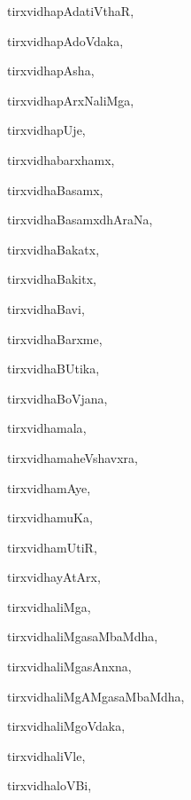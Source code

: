 \begin{multicols}{3}
{\noindent
{tirxvidhapAdatiVthaR}, \pageref{tirxvidhapAdatiVthaR}

\noindent
{tirxvidhapAdoVdaka}, \pageref{tirxvidhapAdoVdaka}

\noindent
{tirxvidhapAsha}, \pageref{tirxvidhapAsha}

\noindent
{tirxvidhapArxNaliMga}, \pageref{tirxvidhapArxNaliMga}

\noindent
{tirxvidhapUje}, \pageref{tirxvidhapUje}

\noindent
{tirxvidhabarxhamx}, \pageref{tirxvidhabarxhamx}

\noindent
{tirxvidhaBasamx}, \pageref{tirxvidhaBasamx}

\noindent
{tirxvidhaBasamxdhAraNa}, \pageref{tirxvidhaBasamxdhAraNa}

\noindent
{tirxvidhaBakatx}, \pageref{tirxvidhaBakatx}

\noindent
{tirxvidhaBakitx}, \pageref{tirxvidhaBakitx}

\noindent
{tirxvidhaBavi}, \pageref{tirxvidhaBavi}

\noindent
{tirxvidhaBarxme}, \pageref{tirxvidhaBarxme}

\noindent
{tirxvidhaBUtika}, \pageref{tirxvidhaBUtika}

\noindent
{tirxvidhaBoVjana}, \pageref{tirxvidhaBoVjana}

\noindent
{tirxvidhamala}, \pageref{tirxvidhamala}

\noindent
{tirxvidhamaheVshavxra}, \pageref{tirxvidhamaheVshavxra}

\noindent
{tirxvidhamAye}, \pageref{tirxvidhamAye}

\noindent
{tirxvidhamuKa}, \pageref{tirxvidhamuKa}

\noindent
{tirxvidhamUtiR}, \pageref{tirxvidhamUtiR}

\noindent
{tirxvidhayAtArx}, \pageref{tirxvidhayAtArx}

\noindent
{tirxvidhaliMga}, \pageref{tirxvidhaliMga}

\noindent
{tirxvidhaliMgasaMbaMdha}, \pageref{tirxvidhaliMgasaMbaMdha}

\noindent
{tirxvidhaliMgasAnxna}, \pageref{tirxvidhaliMgasAnxna}

\noindent
{tirxvidhaliMgAMgasaMbaMdha}, \pageref{tirxvidhaliMgAMgasaMbaMdha}

\noindent
{tirxvidhaliMgoVdaka}, \pageref{tirxvidhaliMgoVdaka}

\noindent
{tirxvidhaliVle}, \pageref{tirxvidhaliVle}

\noindent
{tirxvidhaloVBi}, \pageref{tirxvidhaloVBi}

}
\end{multicols}
